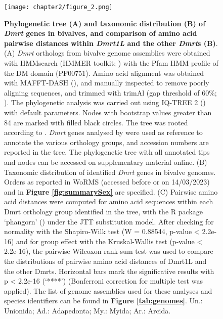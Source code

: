 \documentclass[../main.tex]{subfiles}
\begin{document}
\begin{figure}
    \centering
    \texttt{[image: chapter2/figure\_2.png]}
    \captionsetup{width=\textwidth}
    \caption{
    \textbf{Phylogenetic tree (A) and taxonomic distribution (B) of \textit{Dmrt} genes in bivalves, and comparison of amino acid pairwise distances within \textit{Dmrt1L} and the other \textit{Dmrt}s (B)}. (A) \textit{Dmrt} orthologs from bivalve genome assemblies were obtained with HMMsearch (HMMER toolkit; \textbf{\cite{eddy2011accelerated}}) with the Pfam HMM profile of the DM domain (PF00751). Amino acid alignment was obtained with MAFFT-DASH (\textbf{\cite{rozewicki2019mafft}}), and manually inspected to remove poorly aligning sequences, and trimmed with trimAl (gap threshold of 60\%; \textbf{\cite{capella2009trimal}}). The phylogenetic analysis was carried out using IQ-TREE 2 (\textbf{\cite{minh2020iq}}) with default parameters. Nodes with bootstrap values greater than 84 are marked with filled black circles. The tree was rooted according to \textbf{\cite{evensen2022comparative}}. \textit{Dmrt} genes analysed by \textbf{\cite{evensen2022comparative}} were used as reference to annotate the various orthology groups, and accession numbers are reported in the tree. The phylogenetic tree with all annotated tips and nodes can be accessed on supplementary material online. (B) Taxonomic distribution of identified \textit{Dmrt} genes in bivalve genomes. Orders as reported in WoRMS (accessed before or on 14/03/2023) and in \textbf{Figure \ref{fig:summarySex}} are specified. (C) Pairwise amino acid distances were computed for amino acid sequences within each Dmrt orthology group identified in the tree, with the R package ‘phangorn’ (\textbf{\cite{schliep2011phangorn}}) under the JTT substitution model. After checking for normality with the Shapiro-Wilk test (W = 0.88544, p-value < 2.2e-16) and for group effect with the Kruskal-Wallis test (p-value < 2.2e-16), the pairwise Wilcoxon rank-sum test was used to compare the distributions of pairwise amino acid distances of Dmrt1L and the other Dmrts. Horizontal bars mark the significative results with p < 2.2e-16 (‘****’) (Bonferroni correction for multiple test was applied). The list of genome assemblies used for these analyses and species identifiers can be found in \textbf{Figure \ref{tab:genomes}}. Un.: Unionida; Ad.: Adapedonta; My.: Myida; Ar.: Arcida.
    }
    
    \label{fig:dmrt}
\end{figure}
\end{document}
